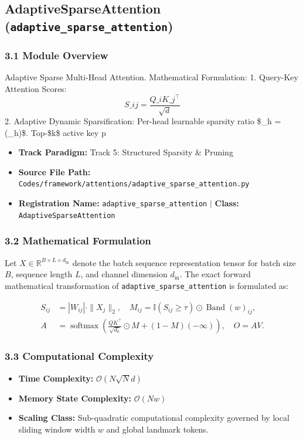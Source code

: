 \subsection{AdaptiveSparseAttention (\texttt{adaptive\_sparse\_attention})}
\label{sec:app_module_adaptive_sparse_attention}

\subsubsection*{3.1 Module Overview}
Adaptive Sparse Multi-Head Attention.  Mathematical Formulation:     1. Query-Key Attention Scores:        $$S\_{ij} = \frac{Q\_i K\_j^\top}{\sqrt{d}}$$          2. Adaptive Dynamic Sparsification:        Per-head learnable sparsity ratio \$\gamma\_h = \sigma(\_h)\$.        Top-\$k\$ active key p
\begin{itemize}
    \item \textbf{Track Paradigm:} Track 5: Structured Sparsity & Pruning
    \item \textbf{Source File Path:} \texttt{Codes/framework/attentions/adaptive\_sparse\_attention.py}
    \item \textbf{Registration Name:} \texttt{adaptive\_sparse\_attention} $\mid$ \textbf{Class:} \texttt{AdaptiveSparseAttention}
\end{itemize}

\subsubsection*{3.2 Mathematical Formulation}
Let $X \in \mathbb{R}^{B \times L \times d_{\text{in}}}$ denote the batch sequence representation tensor for batch size $B$, sequence length $L$, and channel dimension $d_{\text{in}}$. The exact forward mathematical transformation of \texttt{adaptive\_sparse\_attention} is formulated as:

\begin{align}
S_{ij} &= |W_{ij}| \cdot \|X_j\|_2, \quad M_{ij} = \mathbb{I}(S_{ij} \ge \tau) \odot \operatorname{Band}(w)_{ij}, \\
A &= \operatorname{softmax}\left(\frac{Q K^\top}{\sqrt{d_k}} \odot M + (1 - M)(-\infty)\right), \quad O = A V.
\end{align}


\subsubsection*{3.3 Computational Complexity}
\begin{itemize}
    \item \textbf{Time Complexity:} $\mathcal{O}(N \sqrt{N} d)$
    \item \textbf{Memory State Complexity:} $\mathcal{O}(N w)$
    \item \textbf{Scaling Class:} Sub-quadratic computational complexity governed by local sliding window width $w$ and global landmark tokens.
\end{itemize}

